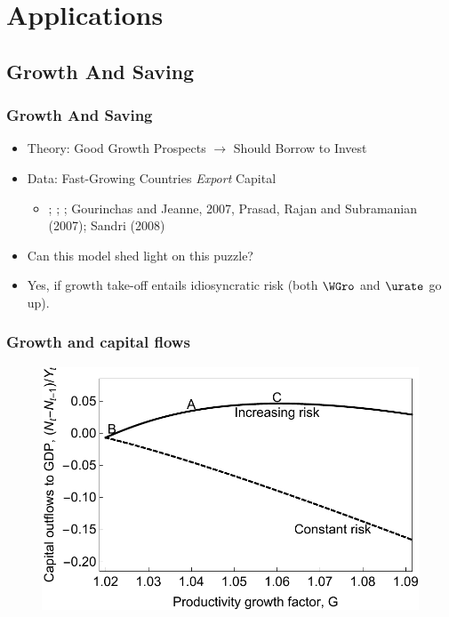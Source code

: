 \documentclass{beamer}
\begin{document}
\section{Applications}
\subsection{Growth And Saving}
\begin{frame}
\frametitle{Growth And Saving}
    \begin{itemize}
    \item Theory: Good Growth Prospects $\rightarrow$ Should Borrow to Invest
    \item Data: Fast-Growing Countries {\it Export} Capital 
\begin{itemize}
\item \cite{carroll&weil:crcs}; \cite{lss:whatdrives}; \cite{aps:sgi}; Gourinchas and Jeanne, 2007, Prasad, Rajan and Subramanian (2007); Sandri (2008)
\end{itemize}
    \item Can this model shed light on this puzzle?
    \item Yes, if growth take-off entails idiosyncratic risk (both $\WGro$ and $\urate$ go up).
    \end{itemize}

\end{frame}


\begin{frame}
\frametitle{Growth and capital flows}
    \begin{figure}
    \centering
    \includegraphics[width=.6\textwidth]{../figures/capOutflows.pdf}
    \end{figure}
\end{frame}

\end{document}

